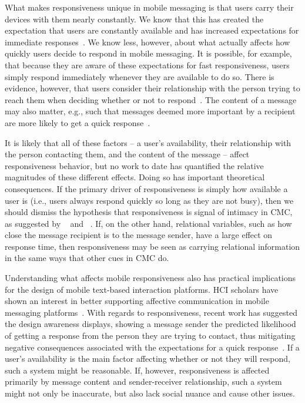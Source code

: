 \documentclass[12pt]{nuthesis}	%
\begin{document}
What makes responsiveness unique in mobile messaging is that users carry their devices with them nearly constantly. We know that this has created the expectation that users are constantly available and has increased expectations for immediate responses~\citep{church2013s}. We know less, however, about what actually affects how quickly users decide to respond in mobile messaging. It is possible, for example, that because they are aware of these expectations for fast responsiveness, users simply respond immediately whenever they are available to do so. There is evidence, however, that users consider their relationship with the person trying to reach them when deciding whether or not to respond~\citep{wohn2015ambient}. The content of a message may also matter, e.g., such that messages deemed more important by a recipient are more likely to get a quick response~\citep{dabbish2005understanding}.

It is likely that all of these factors -- a user's availability, their relationship with the person contacting them, and the content of the message -- affect responsiveness behavior, but no work to date has quantified the relative magnitudes of these different effects. Doing so has important theoretical consequences. If the primary driver of responsiveness is simply how available a user is (i.e., users always respond quickly so long as they are not busy), then we should dismiss the hypothesis that responsiveness is signal of intimacy in CMC, as suggested by ~\citet{kalman2006pauses} and ~\citet{walther1995nonverbal}. If, on the other hand, relational variables, such as how close the message recipient is to the message sender, have a large effect on response time, then responsiveness may be seen as carrying relational information in the same ways that other cues in CMC do.

Understanding what affects mobile responsiveness also has practical implications for the design of mobile text-based interaction platforms. HCI scholars have shown an interest in better supporting affective communication in mobile messaging platforms~\citep[e.g.][]{amin2005sensems}. With regards to responsiveness, recent work has suggested the design awareness displays, showing a message sender the predicted likelihood of getting a response from the person they are trying to contact, thus mitigating negative consequences associated with the expectations for a quick response~\citep{pielot2014didn}. If a user's availability is the main factor affecting whether or not they will respond, such a system might be reasonable. If, however, responsiveness is affected primarily by message content and sender-receiver relationship, such a system might not only be inaccurate, but also lack social nuance and cause other issues.
\end{document}
